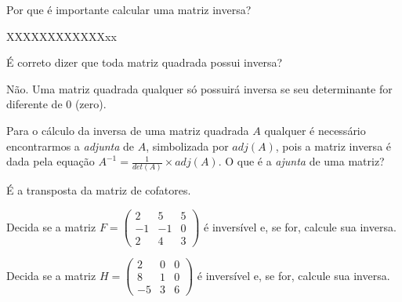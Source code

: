 \documentclass[pdftex, brazil, 12pt, oneside, addpoints]{exam}
\begin{document}
\begin{questions}
\question
Por que é importante calcular uma matriz inversa?
\begin{solutionorlines}[0.75in]
  XXXXXXXXXXXXxx
\end{solutionorlines}


\question
É correto dizer que toda matriz quadrada possui inversa?
\begin{solutionorlines}[0.50in]
  Não. Uma matriz quadrada qualquer só possuirá inversa se seu
  determinante for diferente de 0 (zero).
\end{solutionorlines}

\question
Para o cálculo da inversa de uma matriz quadrada $A$ qualquer é
necessário encontrarmos a \emph{adjunta} de $A$, simbolizada por
$adj(A)$, pois a matriz inversa
é dada pela equação $\displaystyle A^{-1} = \frac{1}{det(A)} \times adj(A)$. O
que é a \emph{ajunta} de uma matriz?
\begin{solutionorlines}[0.50in]
  É a transposta da matriz de cofatores.
\end{solutionorlines}



\question
Decida se a matriz $F = \begin{pmatrix}
  2 & 5 & 5\\
  -1 & -1 & 0\\
  2 & 4 & 3
\end{pmatrix}$ é inversível e, se for, calcule sua inversa.

\question
Decida se a matriz $H = \begin{pmatrix}
  2 & 0 & 0\\
  8 & 1 & 0\\
  -5 & 3 & 6
\end{pmatrix}$ é inversível e, se for, calcule sua inversa.




\end{questions}
\end{document}
